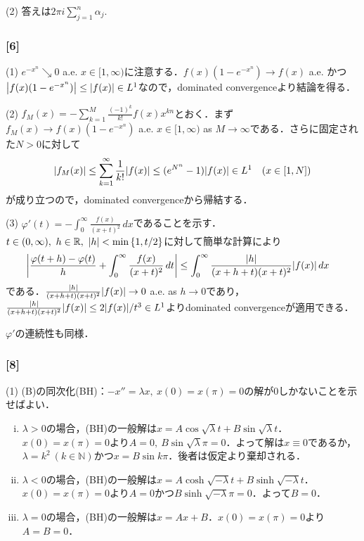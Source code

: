 \documentclass[a4j]{ltjsarticle}
\newcommand{\Rset}{\mathbb{R}}
\newcommand{\Nset}{\mathbb{N}}
\newcommand{\1}{\mathbbm{1}}
\numberwithin{equation}{section}
\theoremstyle{definition}
\begin{document}
(2) 答えは$2\pi i\sum_{j=1}^n \alpha_j$.

\subsubsection*{[6]}
(1) $e^{-x^n}\searrow 0$ a.e. $x\in[1,\infty)$に注意する．$f(x)(1-e^{-x^n})\to f(x)$ a.e. かつ$\abs{f(x)(1-e^{-x^n})}\leq \abs{f(x)}\in L^1$なので，dominated convergenceより結論を得る．

(2) $f_M(x)=-\sum_{k=1}^M \frac{(-1)^k}{k!}f(x)x^{kn}$とおく．まず$f_M(x)\to f(x)(1-e^{-x^n})$ a.e. $x\in [1,\infty)$ as $M\to\infty$である．さらに固定された$N>0$に対して
\begin{equation}
    \abs{f_M(x)}\leq \sum_{k=1}^{\infty}\frac{1}{k!}\abs{f(x)}\leq (e^{N^n}-1)\abs{f(x)}\in L^1\quad (x\in[1,N])
\end{equation}
が成り立つので，dominated convergenceから帰結する．

(3) $\varphi'(t)=-\int_{0}^{\infty}\frac{f(x)}{(x+t)^2}\,dx$であることを示す．$t\in(0,\infty),\ h\in\Rset,\ \abs{h}<\min\qty{1,t/2}$に対して簡単な計算により
\begin{align}
    \abs{\frac{\varphi(t+h)-\varphi(t)}{h}+\int_{0}^{\infty}\frac{f(x)}{(x+t)^2}\,dt}&\leq\int_{0}^{\infty}\frac{\abs{h}}{(x+h+t)(x+t)^2}\abs{f(x)}\,dx
\end{align}
である．$\frac{\abs{h}}{(x+h+t)(x+t)^2}\abs{f(x)}\to0$ a.e. as $h\to0$であり，$\frac{\abs{h}}{(x+h+t)(x+t)^2}\abs{f(x)}\leq 2\abs{f(x)}/t^3\in L^1$よりdominated convergenceが適用できる．

$\varphi'$の連続性も同様．

\subsubsection*{[8]}
(1) (B)の同次化(BH)：$-x''=\lambda x,\ x(0)=x(\pi)=0$の解が0しかないことを示せばよい．
\begin{enumerate}[(i)]
    \item $\lambda>0$の場合，(BH)の一般解は$x=A\cos\sqrt{\lambda}t+B\sin \sqrt{\lambda}t$．$x(0)=x(\pi)=0$より$A=0,\ B\sin\sqrt{\lambda}\pi=0$．よって解は$x\equiv 0$であるか，$\lambda=k^2\ (k\in\Nset)$かつ$x=B\sin k\pi$．後者は仮定より棄却される．
    \item $\lambda<0$の場合，(BH)の一般解は$x=A\cosh \sqrt{-\lambda}t+B\sinh \sqrt{-\lambda}t$．$x(0)=x(\pi)=0$より$A=0$かつ$B\sinh\sqrt{-\lambda}\pi=0$．よって$B=0$．
    \item $\lambda=0$の場合，(BH)の一般解は$x=Ax+B$．$x(0)=x(\pi)=0$より$A=B=0$．
\end{enumerate}
\end{document}
